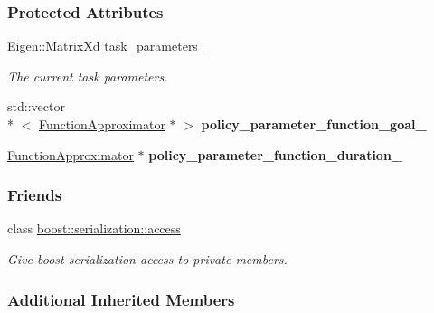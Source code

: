 \subsubsection*{Protected Attributes}
\begin{DoxyCompactItemize}
\item 
\hypertarget{classDmpBbo_1_1DmpContextual_af0d2e6fef248e131b92fc244b55b50c6}{Eigen\+::\+Matrix\+Xd \hyperlink{classDmpBbo_1_1DmpContextual_af0d2e6fef248e131b92fc244b55b50c6}{task\+\_\+parameters\+\_\+}}\label{classDmpBbo_1_1DmpContextual_af0d2e6fef248e131b92fc244b55b50c6}

\begin{DoxyCompactList}\small\item\em The current task parameters. \end{DoxyCompactList}\item 
\hypertarget{classDmpBbo_1_1DmpContextual_a5cc20ed7851ab64bba835680fb450598}{std\+::vector\\*
$<$ \hyperlink{classDmpBbo_1_1FunctionApproximator}{Function\+Approximator} $\ast$ $>$ {\bfseries policy\+\_\+parameter\+\_\+function\+\_\+goal\+\_\+}}\label{classDmpBbo_1_1DmpContextual_a5cc20ed7851ab64bba835680fb450598}

\item 
\hypertarget{classDmpBbo_1_1DmpContextual_ade0445e381bc56ea93bb157067559794}{\hyperlink{classDmpBbo_1_1FunctionApproximator}{Function\+Approximator} $\ast$ {\bfseries policy\+\_\+parameter\+\_\+function\+\_\+duration\+\_\+}}\label{classDmpBbo_1_1DmpContextual_ade0445e381bc56ea93bb157067559794}

\end{DoxyCompactItemize}
\subsubsection*{Friends}
\begin{DoxyCompactItemize}
\item 
class \hyperlink{classDmpBbo_1_1DmpContextual_ac98d07dd8f7b70e16ccb9a01abf56b9c}{boost\+::serialization\+::access}
\begin{DoxyCompactList}\small\item\em Give boost serialization access to private members. \end{DoxyCompactList}\end{DoxyCompactItemize}
\subsubsection*{Additional Inherited Members}


